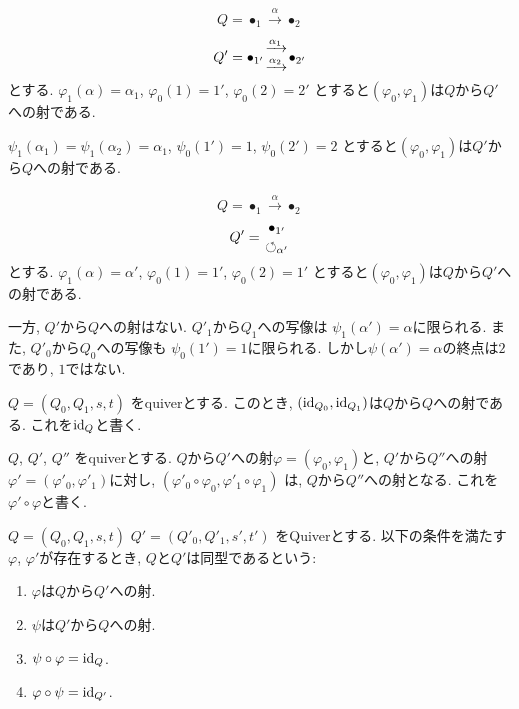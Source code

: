 \begin{example}
  \ZU
  \begin{align*}
    Q=\bullet_{1} \xrightarrow{\alpha} \bullet_{2}
  \end{align*}
  \begin{align*}
    Q'=\bullet_{1'}
    \genfrac{}{}{0pt}{}{\xrightarrow{\alpha_1}}{\xrightarrow{\alpha_2}}
    \bullet_{2'}
  \end{align*}
  とする.
  $\varphi_1(\alpha)=\alpha_1$,
  $\varphi_0(1)=1'$,
  $\varphi_0(2)=2'$
  とすると$(\varphi_0,\varphi_1)$は$Q$から$Q'$への射である.

  $\psi_1(\alpha_1)=\psi_1(\alpha_2)=\alpha_1$,
  $\psi_0(1')=1$,
  $\psi_0(2')=2$
  とすると$(\varphi_0,\varphi_1)$は$Q'$から$Q$への射である.  
\end{example}

\begin{example}
  \ZU
  \begin{align*}
    Q=\bullet_{1} \xrightarrow{\alpha} \bullet_{2}
  \end{align*}
  \begin{align*}
    Q'=\genfrac{}{}{0pt}{}{\bullet_{1'}}{\circlearrowleft_{\alpha'}}
  \end{align*}
  とする.
  $\varphi_1(\alpha)=\alpha'$,
  $\varphi_0(1)=1'$,
  $\varphi_0(2)=1'$
  とすると$(\varphi_0,\varphi_1)$は$Q$から$Q'$への射である.

  一方, $Q'$から$Q$への射はない.
  $Q'_1$から$Q_1$への写像は
  $\psi_1(\alpha')=\alpha$に限られる.
  また, $Q'_0$から$Q_0$への写像も
  $\psi_0(1')=1$に限られる.
  しかし$\psi(\alpha')=\alpha$の終点は$2$であり, $1$ではない.
\end{example}


\begin{example}
  $Q=(Q_0,Q_1,s,t)$
  をquiverとする.
  このとき, $(\operatorname{id}_{Q_0},\operatorname{id}_{Q_1})$は$Q$から$Q$への射である.
  これを$\operatorname{id}_Q$と書く.
\end{example}
\begin{example}
  $Q$, $Q'$, $Q''$
  をquiverとする.
  $Q$から$Q'$への射$\varphi=(\varphi_0,\varphi_1)$と,
  $Q'$から$Q''$への射$\varphi'=(\varphi'_0,\varphi'_1)$に対し,
  $(\varphi'_0\circ \varphi_0,\varphi'_1\circ \varphi_1)$
  は, $Q$から$Q''$への射となる.
  これを$\varphi' \circ \varphi$と書く.
\end{example}
\begin{definition}
  $Q=(Q_0,Q_1,s,t)$
  $Q'=(Q'_0,Q'_1,s',t')$
  をQuiverとする.
  以下の条件を満たす$\varphi$, $\varphi'$が存在するとき,
  $Q$と$Q'$は同型であるという:
  \begin{enumerate}
  \item $\varphi$は$Q$から$Q'$への射.
  \item $\psi$は$Q'$から$Q$への射.
  \item $\psi\circ\varphi=\operatorname{id}_{Q}$.
  \item $\varphi\circ\psi=\operatorname{id}_{Q'}$.
  \end{enumerate}
\end{definition}

